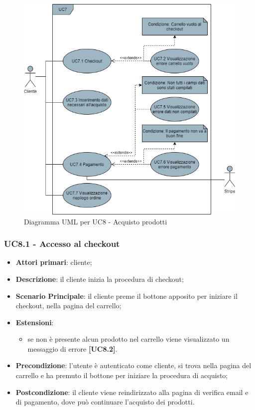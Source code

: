 \begin{figure}[H]
\centering
\includegraphics[scale=0.6]{res/UseCase/Immagini/AcquistoProdotti}
\caption{Diagramma UML per UC8 - Acquisto prodotti}
\end{figure}

\subsubsection{UC8.1 - Accesso al checkout}
\begin{itemize}
\item \textbf{Attori primari}: cliente;
\item \textbf{Descrizione}: il cliente inizia la procedura di checkout;
\item \textbf{Scenario Principale}: il cliente preme il bottone apposito per iniziare il checkout, nella pagina del carrello;
\item \textbf{Estensioni}:
\begin{itemize}
\item se non è presente alcun prodotto nel carrello viene visualizzato un messaggio di errore \textbf{[UC8.2]}.
\end{itemize}
\item \textbf{Precondizione}: l'utente è autenticato come cliente, si trova nella pagina del carrello e ha premuto il bottone per iniziare la procedura di acquisto;
\item \textbf{Postcondizione}: il cliente viene reindirizzato alla pagina di verifica email e di pagamento, dove può continuare l'acquisto dei prodotti.
\end{itemize}

